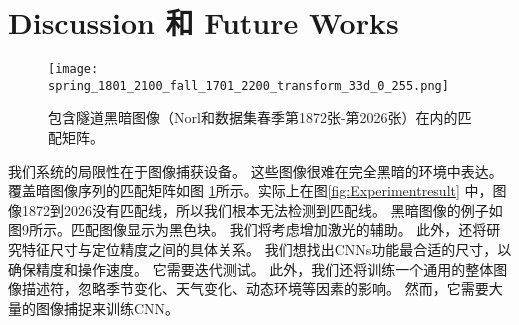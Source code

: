 \section{Discussion 和 Future Works}
\begin{figure}[H]
  \centering
  \texttt{[image: spring\_1801\_2100\_fall\_1701\_2200\_transform\_33d\_0\_255.png]} 
  \caption{包含隧道黑暗图像（Norl和数据集春季第1872张-第2026张）在内的匹配矩阵。}
  \label{fig:Darkimages}
\end{figure}
我们系统的局限性在于图像捕获设备。 这些图像很难在完全黑暗的环境中表达。 覆盖暗图像序列的匹配矩阵如图 \ref{fig:Darkimages}所示。实际上在图\ref{fig:Experimentresult} 中，图像1872到2026没有匹配线，所以我们根本无法检测到匹配线。 黑暗图像的例子如图9所示。匹配图像显示为黑色块。 我们将考虑增加激光的辅助。 此外，还将研究特征尺寸与定位精度之间的具体关系。 我们想找出CNNs功能最合适的尺寸，以确保精度和操作速度。 它需要迭代测试。 此外，我们还将训练一个通用的整体图像描述符，忽略季节变化、天气变化、动态环境等因素的影响。 然而，它需要大量的图像捕捉来训练CNN。

